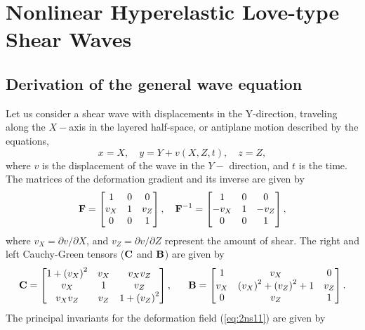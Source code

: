 \documentclass[11pt,letter,subeqn,fleqn]{article}
\numberwithin{equation}{section}
\numberwithin{table}{section}
\numberwithin{figure}{section}
\def\vec#1{{\boldsymbol{\rm #1}}} %
\def\vec#1{{\boldsymbol{\rm #1}}} %
\begin{document}
\section{Nonlinear Hyperelastic Love-type Shear Waves}\label{Sec:NonlinearHyperelasticLoveWaves}

\subsection{Derivation of the general wave equation}\label{sec:nonlWderivation}
Let us consider a shear wave with displacements in the Y-direction, traveling along the $X-$axis in the layered half-space, or antiplane motion \cite{eringen1975elastodynamics,eringen1978elastodynamics} described by the equations,
\begin{equation}\label{eq:2ns11}
x={X},\quad y=Y+ {v}({X},Z,t),\quad z={Z},
\end{equation}
where $v$ is the displacement of the wave in the $Y-$ direction, and $t$ is the time.
The matrices of the deformation gradient and its inverse are given by
\begin{equation}\label{eq:2ss2}
\vec{F}
=\begin{bmatrix}
1 & 0&0\\
v_X & 1&v_Z\\
0 & 0&1
\end{bmatrix},\quad
\vec{F}^{-1}=\begin{bmatrix}
1 & 0&0\\
-v_X & 1&-v_Z\\
0 & 0&1
\end{bmatrix},
\end{equation}
where $v_X=\partial v/\partial X$, and $v_Z=\partial v/\partial Z$ represent the amount of shear.
The right and left Cauchy-Green tensors ($\vec{C}$ and $\vec{B}$) are given by
\begin{equation}\label{eq:2ss3}
\vec{C}=\begin{bmatrix}
1+\left(v_X\right)^2 & v_X&v_{X}v_Z\\
v_X & 1&v_Z\\
v_{X}v_Z & v_Z&1+\left(v_Z\right)^2
\end{bmatrix}, \;\;\;\;\;\;
\vec{B}=\begin{bmatrix}
1 & v_X&0\\
v_X & \left(v_X\right)^2+\left(v_Z\right)^2+1&v_Z\\
0 &v_Z &1
\end{bmatrix}.
\end{equation} The principal invariants for the deformation field (\ref{eq:2ns11}) are given by
\end{document}
